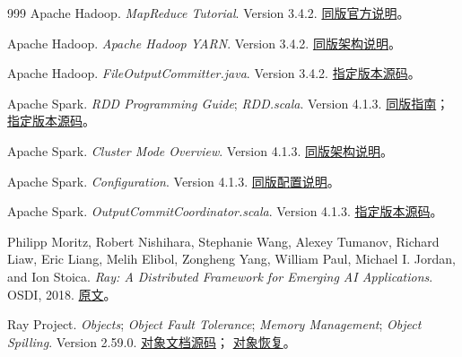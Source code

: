 \begin{thebibliography}{999}
Apache Hadoop.
\textit{MapReduce Tutorial}. Version 3.4.2.
\href{https://hadoop.apache.org/docs/r3.4.2/hadoop-mapreduce-client/hadoop-mapreduce-client-core/MapReduceTutorial.html}{同版官方说明}。

Apache Hadoop.
\textit{Apache Hadoop YARN}. Version 3.4.2.
\href{https://hadoop.apache.org/docs/r3.4.2/hadoop-yarn/hadoop-yarn-site/YARN.html}{同版架构说明}。

Apache Hadoop.
\textit{FileOutputCommitter.java}. Version 3.4.2.
\href{https://github.com/apache/hadoop/blob/rel/release-3.4.2/hadoop-mapreduce-project/hadoop-mapreduce-client/hadoop-mapreduce-client-core/src/main/java/org/apache/hadoop/mapreduce/lib/output/FileOutputCommitter.java}{指定版本源码}。

Apache Spark.
\textit{RDD Programming Guide}; \textit{RDD.scala}. Version 4.1.3.
\href{https://spark.apache.org/docs/4.1.3/rdd-programming-guide.html}{同版指南}；
\href{https://github.com/apache/spark/blob/v4.1.3/core/src/main/scala/org/apache/spark/rdd/RDD.scala}{指定版本源码}。

Apache Spark.
\textit{Cluster Mode Overview}. Version 4.1.3.
\href{https://spark.apache.org/docs/4.1.3/cluster-overview.html}{同版架构说明}。

Apache Spark.
\textit{Configuration}. Version 4.1.3.
\href{https://spark.apache.org/docs/4.1.3/configuration.html}{同版配置说明}。

Apache Spark.
\textit{OutputCommitCoordinator.scala}. Version 4.1.3.
\href{https://github.com/apache/spark/blob/v4.1.3/core/src/main/scala/org/apache/spark/scheduler/OutputCommitCoordinator.scala}{指定版本源码}。

Philipp Moritz, Robert Nishihara, Stephanie Wang, Alexey Tumanov,
Richard Liaw, Eric Liang, Melih Elibol, Zongheng Yang, William Paul,
Michael I. Jordan, and Ion Stoica.
\textit{Ray: A Distributed Framework for Emerging AI Applications}.
OSDI, 2018.
\href{https://www.usenix.org/system/files/osdi18-moritz.pdf}{原文}。

Ray Project.
\textit{Objects}; \textit{Object Fault Tolerance};
\textit{Memory Management}; \textit{Object Spilling}. Version 2.59.0.
\href{https://github.com/ray-project/ray/tree/ray-2.59.0/doc/source/ray-core/objects}{对象文档源码}；
\href{https://github.com/ray-project/ray/blob/ray-2.59.0/doc/source/ray-core/fault_tolerance/objects.rst}{对象恢复}。


\end{thebibliography}
